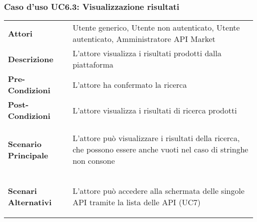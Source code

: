 \subsubsection{Caso d'uso UC6.3: Visualizzazione risultati}
\label{UC6_3}

\begin{minipage}{\linewidth}
	\begin{tabular}{ l | p{11cm}}
		\hline
		\rowcolor{Gray}
		\multicolumn{2}{c}{UC6.3 - Visualizzazione risultati} \\
		\hline
		\textbf{Attori} & Utente generico, Utente non autenticato, Utente autenticato, Amministratore API Market \\
		\textbf{Descrizione} & L'attore visualizza i risultati prodotti dalla piattaforma\\
		\textbf{Pre-Condizioni} & L'attore ha confermato la ricerca\\
		\textbf{Post-Condizioni} & L'attore visualizza i risultati di ricerca prodotti \\
		\textbf{Scenario Principale} & 
		\begin{enumerate*}[label=(\arabic*.),itemjoin={\newline}]
			\item L'attore può visualizzare i risultati della ricerca, che possono essere anche vuoti nel caso di stringhe non consone
		\end{enumerate*}\\
		\textbf{Scenari Alternativi} & 
		\begin{enumerate*}[label=(\arabic*.),itemjoin={\newline}]
		\item L'attore può accedere alla schermata delle singole API tramite la lista delle API (UC7)
	\end{enumerate*}\\
	\end{tabular}
\end{minipage}